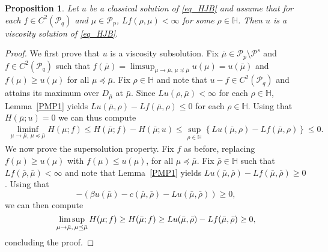 \documentclass{article}
\newtheorem{proposition}[theorem]{Proposition}
\theoremstyle{definition}
\numberwithin{equation}{section}
\numberwithin{theorem}{section}
\newcommand{\Hb}{\mathbb{H}}
\newcommand{\Pcal}{{\mathcal P}}
\begin{document}
\begin{proposition}\label{lem1}
Let $u$ be a classical solution of \eqref{eq_HJB} and assume that for each $f\in C^2(\Pcal_q)$ and $\mu\in \Pcal_p$, $Lf( \rho,\mu)< \infty$ for some $\rho \in \Hb$. Then $u$ is a viscosity solution of \eqref{eq_HJB}. 
\end{proposition}






\begin{proof}
We first prove that $u$ is a viscosity subsolution. Fix $\bar\mu\in\Pcal_p\setminus\Pcal^s$ and $f\in C^2(\Pcal_q)$ such that $f(\bar\mu)=\limsup_{\mu\to\bar\mu,\,\mu\preceq\bar\mu}u(\mu)=u(\bar \mu)$ and $f(\mu)\ge u(\mu)$ for all $\mu\preceq\bar\mu$.
Fix $\rho\in \Hb$ and note that $u-f\in  C^2(\Pcal_q)$ and attains its maximum over $D_{\bar \mu}$ at $\bar \mu$. Since $Lu( \rho,\bar \mu)<\infty$ for each $\rho \in \Hb$, Lemma~\ref{PMP1}  yields
$Lu(\bar \mu,\rho)-Lf(\bar \mu,\rho)\leq 0$ for each $\rho\in \Hb$. Using that $ H(\bar \mu;u)= 0$ we can thus compute
\begin{align*}
\liminf_{\mu\to\bar\mu,\, \mu\preceq\bar\mu} H(\mu;f) 
\leq H(\bar\mu;f) -H(\bar\mu;u)
\leq \sup_{\rho\in\Hb}\left\{ Lu(\bar\mu,\rho) -Lf(\bar\mu,\rho)\right\}
\le 0.
\end{align*}
We now prove the supersolution property. Fix $f$ as before, replacing $f(\mu)\geq u(\mu)$ with $f(\mu)\le u(\mu)$, for all $\mu\preceq\bar\mu$. Fix $\bar \rho\in \Hb$ such that $Lf(\bar \rho,\bar \mu)<\infty$ and note that Lemma~\ref{PMP1} yields
$Lu(\bar \mu,\bar \rho)-Lf(\bar \mu,\bar\rho)\geq 0$.
Using that
$$-(\beta u(\bar \mu)-c(\bar \mu,\bar\rho)-Lu(\bar \mu,\bar\rho))\geq 0,$$
we can then compute
$$
\limsup_{\mu\to\bar\mu,\, \mu\preceq\bar\mu} H(\mu;f) 
\geq H(\bar\mu;f)\\
\geq  Lu(\bar\mu,\bar \rho) -Lf(\bar\mu,\bar\rho)\\
\geq 0,
$$
concluding the proof.
\end{proof}
\end{document}
